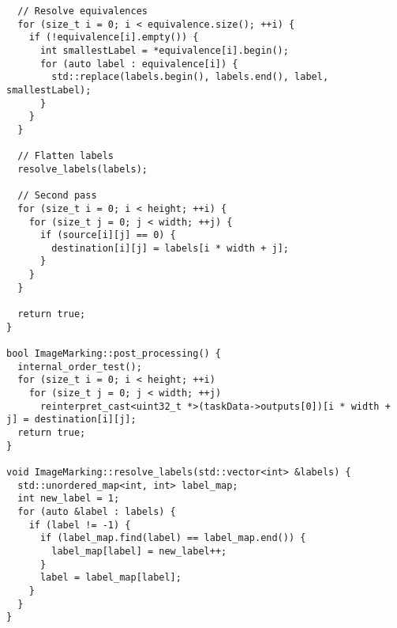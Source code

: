 \documentclass[a4paper, 14pt]{article}
\begin{document}
\begin{verbatim}
  // Resolve equivalences
  for (size_t i = 0; i < equivalence.size(); ++i) {
    if (!equivalence[i].empty()) {
      int smallestLabel = *equivalence[i].begin();
      for (auto label : equivalence[i]) {
        std::replace(labels.begin(), labels.end(), label, smallestLabel);
      }
    }
  }

  // Flatten labels
  resolve_labels(labels);

  // Second pass
  for (size_t i = 0; i < height; ++i) {
    for (size_t j = 0; j < width; ++j) {
      if (source[i][j] == 0) {
        destination[i][j] = labels[i * width + j];
      }
    }
  }

  return true;
}

bool ImageMarking::post_processing() {
  internal_order_test();
  for (size_t i = 0; i < height; ++i)
    for (size_t j = 0; j < width; ++j)
      reinterpret_cast<uint32_t *>(taskData->outputs[0])[i * width + j] = destination[i][j];
  return true;
}

void ImageMarking::resolve_labels(std::vector<int> &labels) {
  std::unordered_map<int, int> label_map;
  int new_label = 1;
  for (auto &label : labels) {
    if (label != -1) {
      if (label_map.find(label) == label_map.end()) {
        label_map[label] = new_label++;
      }
      label = label_map[label];
    }
  }
}
	\end{verbatim}
\end{document}
